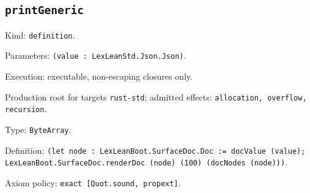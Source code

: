 \documentclass[11pt]{article}
\begin{document}
\subsection*{\texttt{printGeneric}}
\noindent Kind: \texttt{definition}.\par
\noindent Parameters: \texttt{(value : LexLeanStd.Json.Json)}.\par
\noindent Execution: executable, non-escaping closures only.\par
\noindent Production root for targets \texttt{rust-std}; admitted effects: \texttt{allocation, overflow, recursion}.\par
\noindent Type: \texttt{ByteArray}.\par
\noindent Definition: \texttt{(let node : LexLeanBoot.SurfaceDoc.Doc := docValue (value); LexLeanBoot.SurfaceDoc.renderDoc (node) (100) (docNodes (node)))}.\par
\noindent Axiom policy: \texttt{exact [Quot.sound, propext]}.\par
\end{document}
